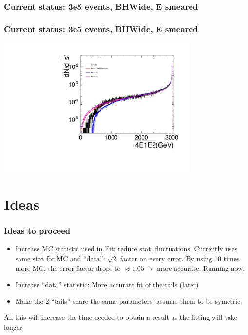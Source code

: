 \documentclass{beamer}
\begin{document}
\begin{frame}
\frametitle{Current status: 3e5 events, BHWide, E smeared}
\end{frame}
\begin{frame}
\frametitle{Current status: 3e5 events, BHWide, E smeared}
\begin{center}
\includegraphics[width=10cm,page=3]{LumiAll.pdf}
\end{center}
\end{frame}
\section{Ideas}
\begin{frame}
\frametitle{Ideas to proceed}
\begin{itemize}
  \item Increase MC statistic used in Fit: reduce stat. fluctuations. Currently
  uses same stat for MC and ``data'': $\sqrt{2}$ factor on every error. By using
  10 times more MC, the error factor drops to $\approx 1.05 \to$ more accurate.
  Running now.
  \item Increase ``data'' statistic: More accurate fit of the tails (later)
  \item Make the 2 ``tails'' share the same parameters: assume them to be
  symetric
\end{itemize}
All this will increase the time needed to obtain a result as the fitting will
take longer
\end{frame}
\end{document}
